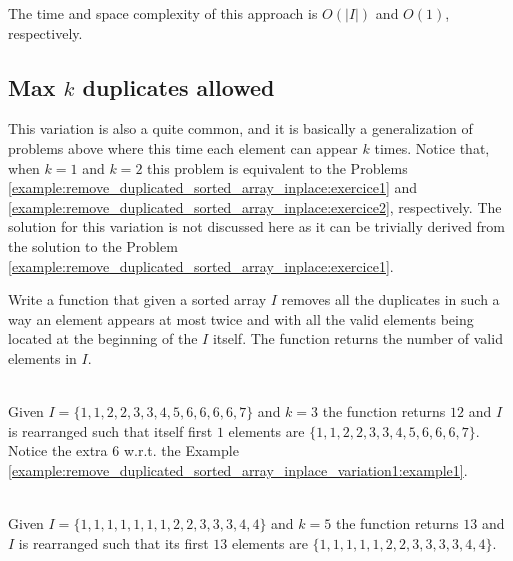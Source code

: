 The time and space complexity of this approach is $O(|I|)$ and $O(1)$, respectively.

\subsection{Max $k$ duplicates allowed}
This variation is also a quite common, and it is basically a generalization of problems above where this time each element can appear $k$ times.
Notice that, when $k= 1$ and $k=2$ this problem is equivalent to the Problems \ref{example:remove_duplicated_sorted_array_inplace:exercice1} and \ref{example:remove_duplicated_sorted_array_inplace:exercice2}, respectively.
The solution for this variation is not discussed here as it can be trivially derived from the solution to the Problem \ref{example:remove_duplicated_sorted_array_inplace:exercice1}.

\begin{exercise}
Write a function that given a sorted array $I$ removes all the 
duplicates in such a way an element appears at most twice and with all the valid elements being located at the beginning of the $I$ itself.
The function returns the number of valid elements in $I$.
	
	\label{example:remove_duplicated_sorted_array_inplace_variation:exercice3}
	
		\begin{example}
			\label{example:remove_duplicated_sorted_array_inplace_variation2:example1}
			\hfill \\
			Given $I=\{1,1,2,2,3,3,4,5,6,6,6,6,7\}$ and $k=3$ the function returns $12$ and $I$ is rearranged such
			that itself first $1$ elements are $\{1,1,2,2,3,3,4,5,6,6,6,7\}$. Notice the extra $6$ w.r.t. the Example \ref{example:remove_duplicated_sorted_array_inplace_variation1:example1}.
		\end{example}
	
		\begin{example}
			\label{example:remove_duplicated_sorted_array_inplace_variation2:example2}
			\hfill \\
			Given $I=\{1,1,1,1,1,1,1,2,2,3,3,3,4,4\}$ and $k=5$ the function returns $13$ and $I$ is rearranged such that its first $13$
			elements are $\{1,1,1,1,1,2,2,3,3,3,3,4,4\}$.	
		\end{example}
	\end{exercise}
